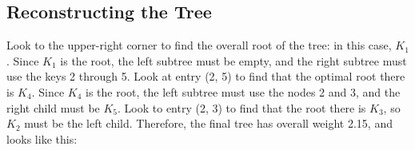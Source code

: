 \documentclass[12pt]{article}
\begin{document}
	\subsection*{Reconstructing the Tree}
	Look to the upper-right corner to find the overall root of the tree: in this case, $K_{1}$. Since
		$K_{1}$ is the root, the left subtree must be empty, and the right subtree must use the
		keys 2 through 5. Look at entry (2, 5) to find that the optimal root there is $K_{4}$.
		Since $K_{4}$ is the root, the left subtree must use the nodes 2 and 3, and the right child
		must be $K_{5}$. Look to entry (2, 3) to find that the root there is $K_{3}$, so $K_{2}$ must
		be the left child. Therefore, the final tree has overall weight 2.15, and looks like this:



		
\end{document}
